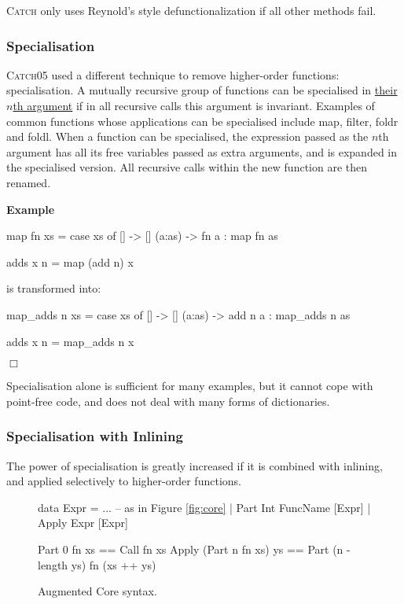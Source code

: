 \documentclass[preprint]{sigplanconf}
\newcommand{\C}[1]{\textsf{#1}}
\newcommand{\catch}{\textsc{Catch}}
\newcounter{exmp}
\newcommand{\yesexample}{\addtocounter{exmp}{1}\addvspace{2mm}\noindent\textbf{Example \arabic{exmp}}}
\newcommand{\noexample}{\hfill$\Box$\par\addvspace{2mm}}
\newenvironment{example}{\yesexample}{\noexample}
\begin{document}
\catch{} only uses Reynold's style defunctionalization if all other methods fail.


\subsubsection{Specialisation}

\catch05 used a different technique to remove higher-order functions: specialisation. A mutually recursive group of functions can be specialised in \underline{their $n$th argument} if in all recursive calls this argument is invariant. Examples of common functions whose applications can be specialised include \C{map}, \C{filter}, \C{foldr} and \C{foldl}. When a function can be specialised, the expression passed as the $n$th argument has all its free variables passed as extra arguments, and is expanded in the specialised version. All recursive calls within the new function are then renamed.

\begin{example}
\begin{code}
map fn xs = case  xs of
                  []      -> []
                  (a:as)  -> fn a : map fn as

adds x n = map (add n) x
\end{code}

\noindent is transformed into:

\begin{code}
map_adds n xs = case  xs of
                      []      -> []
                      (a:as)  -> add n a : map_adds n as

adds x n = map_adds n x
\end{code}
\end{example}

Specialisation alone is sufficient for many examples, but it cannot cope with point-free code, and does not deal with many forms of dictionaries.

\subsubsection{Specialisation with Inlining}

The power of specialisation is greatly increased if it is combined with inlining, and applied selectively to higher-order functions.

\begin{figure}
\begin{code}
data Expr  =  ... -- as in Figure {\ref{fig:core}}
           |  Part   Int FuncName [Expr]
           |  Apply  Expr [Expr]

Part 0 fn xs == Call fn xs
Apply (Part n fn xs) ys == Part (n - length ys) fn (xs ++ ys)
\end{code}
\caption{Augmented Core syntax.}
\label{fig:core_ho}
\end{figure}
\end{document}
